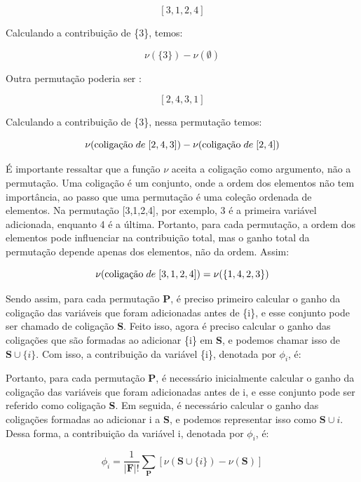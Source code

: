 $$[3,1,2,4]$$

Calculando a contribuição de \{3\}, temos: 

$$\nu(\{3\}) - \nu(\emptyset) $$

Outra permutação poderia ser :

$$[2,4,3,1]$$

Calculando a contribuição de \{3\}, nessa permutação temos: 

$$\nu(\text{coligação} \hspace{1mm} de \hspace{1mm} [2,4,3]) - \nu(\text{coligação} \hspace{1mm} de \hspace{1mm} [2,4]) $$


É importante ressaltar que a função $\nu$ aceita a coligação como argumento, não a permutação. 
Uma coligação é um conjunto, onde a ordem dos elementos não tem importância, ao passo que uma permutação é uma 
coleção ordenada de elementos. Na permutação [3,1,2,4], por exemplo, 3 é a primeira variável adicionada, enquanto 
4 é a última. Portanto, para cada permutação, a ordem dos elementos pode influenciar na contribuição total, mas o
 ganho total da permutação depende apenas dos elementos, não da ordem. Assim:

\[\nu(\text{coligação} \hspace{1mm} de \hspace{1mm} [3,1,2,4]) = \nu(\{1,4,2,3\})\]

Sendo assim, para cada permutação \textbf{P}, é preciso primeiro calcular o ganho da coligação das variáveis que 
foram adicionadas antes de \{i\}, e esse conjunto pode ser chamado de coligação \textbf{S}. Feito isso, agora é 
preciso calcular o ganho das coligações que são formadas ao adicionar \{i\} em \textbf{S}, e podemos chamar
 isso de $\textbf{S} \cup \{i\}$. Com isso, a contribuição da variável \{i\}, denotada por $\phi_{i}$, é:

 Portanto, para cada permutação \textbf{P}, é necessário inicialmente calcular o ganho da coligação das variáveis
  que foram adicionadas antes de {i}, e esse conjunto pode ser referido como coligação \textbf{S}. Em seguida, é
   necessário calcular o ganho das coligações formadas ao adicionar {i} a \textbf{S}, e podemos representar isso 
   como $\textbf{S} \cup {i}$. Dessa forma, a contribuição da variável {i}, denotada por $\phi_{i}$, é:

\begin{equation}
 \phi_i = \frac{1}{|\textbf{F}|!}\sum_{\textbf{P}} [\nu(\textbf{S}\cup\{i\}) - \nu(\textbf{S})]
 \label{eq:value_shap_ini}
\end{equation}


